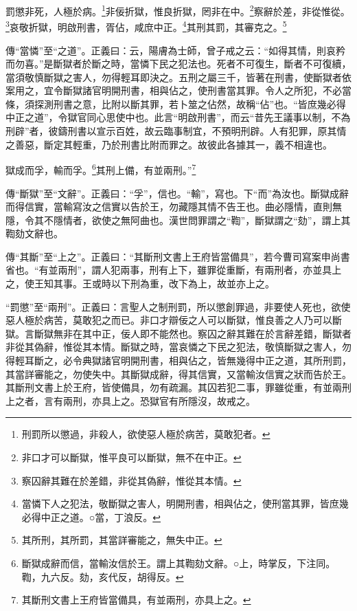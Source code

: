 罰懲非死，人極於病。\footnote{刑罰所以懲過，非殺人，欲使惡人極於病苦，莫敢犯者。}非佞折獄，惟良折獄，罔非在中。\footnote{非口才可以斷獄，惟平良可以斷獄，無不在中正。}察辭於差，非從惟從。\footnote{察囚辭其難在於差錯，非從其偽辭，惟從其本情。}哀敬折獄，明啟刑書，胥佔，咸庶中正。\footnote{當憐下人之犯法，敬斷獄之害人，明開刑書，相與佔之，使刑當其罪，皆庶幾必得中正之道。○當，丁浪反。}其刑其罰，其審克之。\footnote{其所刑，其所罰，其當詳審能之，無失中正。}



{\noindent\zhuan{}\fzbyks 傳“當憐”至“之道”。正義曰：云，陽膚為士師，曾子戒之云：“如得其情，則哀矜而勿喜。”是斷獄者於斷之時，當憐下民之犯法也。死者不可復生，斷者不可復續，當須敬慎斷獄之害人，勿得輕耳即決之。五刑之屬三千，皆著在刑書，使斷獄者依案用之，宜令斷獄諸官明開刑書，相與佔之，使刑書當其罪。令人之所犯，不必當條，須探測刑書之意，比附以斷其罪，若卜筮之佔然，故稱“佔”也。“皆庶幾必得中正之道”，令獄官同心思使中也。此言“明啟刑書”，而云“昔先王議事以制，不為刑辟”者，彼鑄刑書以宣示百姓，故云臨事制宜，不預明刑辟。人有犯罪，原其情之善惡，斷定其輕重，乃於刑書比附而罪之。故彼此各據其一，義不相違也。 \par}

獄成而孚，輸而孚。\footnote{斷獄成辭而信，當輸汝信於王。謂上其鞫劾文辭。○上，時掌反，下注同。鞫，九六反。劾，亥代反，胡得反。}其刑上備，有並兩刑。”\footnote{其斷刑文書上王府皆當備具，有並兩刑，亦具上之。}

{\noindent\zhuan{}\fzbyks 傳“斷獄”至“文辭”。正義曰：“孚”，信也。“輸”，寫也。下“而”為汝也。斷獄成辭而得信實，當輸寫汝之信實以告於王，勿藏隱其情不告王也。曲必隱情，直則無隱，令其不隱情者，欲使之無阿曲也。漢世問罪謂之“鞫”，斷獄謂之“劾”，謂上其鞫劾文辭也。 \par}

{\noindent\zhuan{}\fzbyks 傳“其斷”至“上之”。正義曰：“其斷刑文書上王府皆當備具”，若今曹司寫案申尚書省也。“有並兩刑”，謂人犯兩事，刑有上下，雖罪從重斷，有兩刑者，亦並具上之，使王知其事。王或時以下刑為重，改下為上，故並亦上之。 \par}

{\noindent\shu{}\fzkt “罰懲”至“兩刑”。正義曰：言聖人之制刑罰，所以懲創罪過，非要使人死也，欲使惡人極於病苦，莫敢犯之而已。非口才辯佞之人可以斷獄，惟良善之人乃可以斷獄。言斷獄無非在其中正，佞人即不能然也。察囚之辭其難在於言辭差錯，斷獄者非從其偽辭，惟從其本情。斷獄之時，當哀憐之下民之犯法，敬慎斷獄之害人，勿得輕耳斷之，必令典獄諸官明開刑書，相與佔之，皆無幾得中正之道，其所刑罰，其當詳審能之，勿使失中。其斷獄成辭，得其信實，又當輸汝信實之狀而告於王。其斷刑文書上於王府，皆使備具，勿有疏漏。其囚若犯二事，罪雖從重，有並兩刑上之者，言有兩刑，亦具上之。恐獄官有所隱沒，故戒之。 \par}

